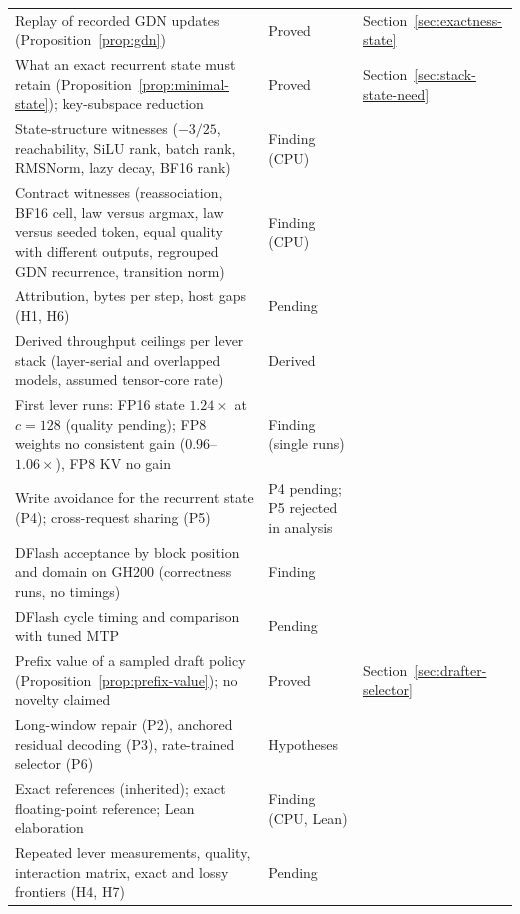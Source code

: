 {\begin{longtable}{@{}P{7.8cm}P{2.5cm}P{4.2cm}@{}}
Replay of recorded GDN updates (Proposition~\ref{prop:gdn}) & Proved & Section~\ref{sec:exactness-state}\\
What an exact recurrent state must retain (Proposition~\ref{prop:minimal-state}); key-subspace reduction & Proved & Section~\ref{sec:stack-state-need}\\
State-structure witnesses ($-3/25$, reachability, SiLU rank, batch rank, RMSNorm, lazy decay, BF16 rank) & Finding (CPU) & \\
Contract witnesses (reassociation, BF16 cell, law versus argmax, law versus seeded token, equal quality with different outputs, regrouped GDN recurrence, transition norm) & Finding (CPU) & \\
Attribution, bytes per step, host gaps (H1, H6) & Pending & \\
Derived throughput ceilings per lever stack (layer-serial and overlapped models, assumed tensor-core rate) & Derived & \\
First lever runs: FP16 state $1.24\times$ at $c=128$ (quality pending); FP8 weights no consistent gain ($0.96$--$1.06\times$), FP8 KV no gain & Finding (single runs) & \\
Write avoidance for the recurrent state (P4); cross-request sharing (P5) & P4 pending; P5 rejected in analysis & \\
DFlash acceptance by block position and domain on GH200 (correctness runs, no timings) & Finding & \\
DFlash cycle timing and comparison with tuned MTP & Pending & \\
Prefix value of a sampled draft policy (Proposition~\ref{prop:prefix-value}); no novelty claimed & Proved & Section~\ref{sec:drafter-selector}\\
Long-window repair (P2), anchored residual decoding (P3), rate-trained selector (P6) & Hypotheses & \\
Exact references (inherited); exact floating-point reference; Lean elaboration & Finding (CPU, Lean) & \\
Repeated lever measurements, quality, interaction matrix, exact and lossy frontiers (H4, H7) & Pending & \\
\end{longtable}}

